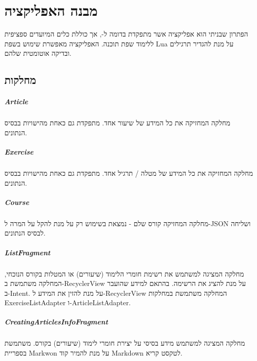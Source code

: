 \chapter{מבנה האפליקציה}

הפתרון שבניתי הוא אפליקציה אשר מתפקדת בדומה ל-,
אך כוללת כלים המיועדים ספציפית ללימוד שפת תוכנה.
האפליקציה מאפשרת שימוש בשפת Lua על מנת להגדיר תרגילים ובדיקה אוטומטית שלהם.

\section{מחלקות}

\paragraph{Article}

מחלקה המחזיקה את כל המידע של שיעור אחד.
מתפקדת גם כאחת מהישויות בבסיס הנתונים.

\paragraph{Exercise}

מחלקה המחזיקה את כל המידע של מטלה / תרגיל אחד.
מתפקדת גם כאחת מהישויות בבסיס הנתונים.

\paragraph{Course}

מחלקה המחזיקה קורס שלם - נמצאת בשימוש רק על מנת להקל על המרה ל-JSON ושליחה לבסיס הנתונים.

\paragraph{ListFragment}

מחלקה המציגה למשתמש את רשימת חומרי הלימוד (שיעורים) או המטלות בקורס הנוכחי,
המחלקה משתמשת ב-RecyclerView על מנת להציג את הרשימה.
בהתאם למידע שהועבר ב-Intent.
על מנת להזין את המידע ל-RecyclerView המחלקה משתמשת במחלקות ExerciseListAdapter ו-ArticleListAdapter.

\paragraph{CreatingArticlesInfoFragment}

מחלקה המציגה למשתמש מידע בסיסי על יצירת חומרי לימוד (שיעורים) בקורס.
משתמשת בספריית Markwon על מנת להמיר קוד Markdown לטקסט קריא.

